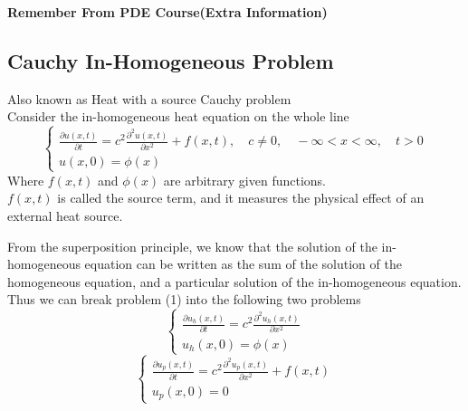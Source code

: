 \setcounter{equation}{0}
\begin{enrichment*}{}
        \begin{center}
                \textbf{Remember From PDE Course(Extra Information)}
        \end{center}
    \end{enrichment*}


\subsection{Cauchy In-Homogeneous Problem}
Also known as Heat with a source Cauchy problem
\\
Consider the in-homogeneous heat equation on the whole line
\begin{equation}
    \begin{cases}
        \displaystyle \frac{\partial u\left(x,t \right)}{\partial t} = c^2 \frac{\partial^2 u(x,t)}{\partial x^2} + f(x,t),\quad c\neq 0,\quad-\infty<x<\infty,\quad t>0
        \\
        u\left(x,0 \right) = \phi\left(x\right)
    \end{cases}
\end{equation}
Where $f(x, t)$ and $\phi(x)$ are arbitrary given functions. 
\\$f(x, t)$ is called the source term, and it measures the physical effect of an external heat source.
\par
From the superposition principle, we know that the solution of the in-homogeneous equation can
be written as the sum of the solution of the homogeneous equation, and a particular solution of the
in-homogeneous equation. 
\\
Thus we can break problem (1) into the following two problems
\begin{equation}
    \begin{cases}
        \displaystyle \frac{\partial u_h\left(x,t \right)}{\partial t} = c^2 \frac{\partial^2 u_h(x,t)}{\partial x^2}
        \\
        u_h\left(x,0 \right) = \phi\left(x\right)
    \end{cases}
\end{equation}
\begin{equation}
    \begin{cases}
        \displaystyle \frac{\partial u_p\left(x,t \right)}{\partial t} = c^2 \frac{\partial^2 u_p(x,t)}{\partial x^2}+ f(x,t)
        \\
        u_p\left(x,0 \right) = 0
    \end{cases}
\end{equation}
